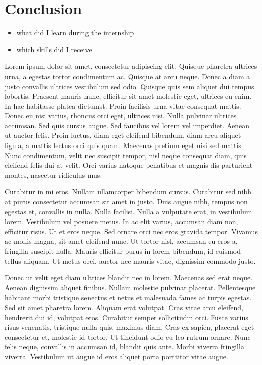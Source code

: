 \documentclass[../00_main.tex]{subfiles}
\begin{document}
\section{Conclusion}

\begin{itemize}
    \item what did I learn during the internship
    \item which skills did I receive
\end{itemize}

Lorem ipsum dolor sit amet, consectetur adipiscing elit. Quisque pharetra ultrices urna, a egestas tortor condimentum ac. Quisque at arcu neque. Donec a diam a justo convallis ultrices vestibulum sed odio. Quisque quis sem aliquet dui tempus lobortis. Praesent mauris nunc, efficitur sit amet molestie eget, ultrices eu enim. In hac habitasse platea dictumst. Proin facilisis urna vitae consequat mattis. Donec eu nisi varius, rhoncus orci eget, ultrices nisi. Nulla pulvinar ultrices accumsan. Sed quis cursus augue. Sed faucibus vel lorem vel imperdiet. Aenean ut auctor felis. Proin luctus, diam eget eleifend bibendum, diam arcu aliquet ligula, a mattis lectus orci quis quam. Maecenas pretium eget nisi sed mattis. Nunc condimentum, velit nec suscipit tempor, nisl neque consequat diam, quis eleifend felis dui at velit. Orci varius natoque penatibus et magnis dis parturient montes, nascetur ridiculus mus.

Curabitur in mi eros. Nullam ullamcorper bibendum cursus. Curabitur sed nibh at purus consectetur accumsan sit amet in justo. Duis augue nibh, tempus non egestas et, convallis in nulla. Nulla facilisi. Nulla a vulputate erat, in vestibulum lorem. Vestibulum vel posuere metus. In ac elit varius, accumsan diam non, efficitur risus. Ut et eros neque. Sed ornare orci nec eros gravida tempor. Vivamus ac mollis magna, sit amet eleifend nunc. Ut tortor nisl, accumsan eu eros a, fringilla suscipit nulla. Mauris efficitur purus in lorem bibendum, id euismod tellus aliquam. Ut metus orci, auctor nec mauris vitae, dignissim commodo justo.

Donec ut velit eget diam ultrices blandit nec in lorem. Maecenas sed erat neque. Aenean dignissim aliquet finibus. Nullam molestie pulvinar placerat. Pellentesque habitant morbi tristique senectus et netus et malesuada fames ac turpis egestas. Sed sit amet pharetra lorem. Aliquam erat volutpat. Cras vitae arcu eleifend, hendrerit dui id, volutpat eros. Curabitur semper sollicitudin orci. Fusce varius risus venenatis, tristique nulla quis, maximus diam. Cras ex sapien, placerat eget consectetur et, molestie id tortor. Ut tincidunt odio eu leo rutrum ornare. Nunc felis neque, convallis in accumsan id, blandit quis ante. Morbi viverra fringilla viverra. Vestibulum ut augue id eros aliquet porta porttitor vitae augue.
\end{document}
